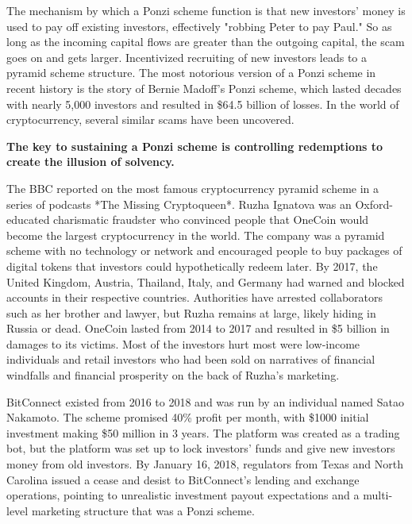 The mechanism by which a Ponzi scheme function is that new investors' money is used to pay off existing investors, effectively "robbing Peter to pay Paul." So as long as the incoming capital flows are greater than the outgoing capital, the scam goes on and gets larger. Incentivized recruiting of new investors leads to a pyramid scheme structure. The most notorious version of a Ponzi scheme in recent history is the story of Bernie Madoff's Ponzi scheme, which lasted decades with nearly 5,000 investors and resulted in \$64.5 billion of losses. In the world of cryptocurrency, several similar scams have been uncovered.

\begin{infobox}
 \textbf{The key to sustaining a Ponzi scheme is controlling redemptions to
  create the illusion of solvency.}
\end{infobox}


The BBC reported on the most famous cryptocurrency pyramid scheme in a series of
podcasts *The Missing Cryptoqueen*. Ruzha Ignatova was an Oxford-educated
charismatic fraudster who convinced people that OneCoin would become the largest
cryptocurrency in the world. The company was a pyramid scheme with no technology
or network and encouraged people to buy packages of digital tokens that
investors could hypothetically redeem later. By 2017, the United Kingdom,
Austria, Thailand, Italy, and Germany had warned and blocked accounts in their
respective countries. Authorities have arrested collaborators such as her
brother and lawyer, but Ruzha remains at large, likely hiding in Russia or dead.
OneCoin lasted from 2014 to 2017 and resulted in \$5 billion in damages to its
victims. Most of the investors hurt most were low-income individuals and retail
investors who had been sold on narratives of financial windfalls and financial
prosperity on the back of Ruzha's marketing.


BitConnect existed from 2016 to 2018 and was run by an individual named Satao
Nakamoto. The scheme promised 40\% profit per month, with \$1000 initial
investment making \$50 million in 3 years. The platform was created as a trading
bot, but the platform was set up to lock investors' funds and give new investors
money from old investors. By January 16, 2018, regulators from Texas and North
Carolina issued a cease and desist to BitConnect's lending and exchange
operations, pointing to unrealistic investment payout expectations and a
multi-level marketing structure that was a Ponzi scheme.

